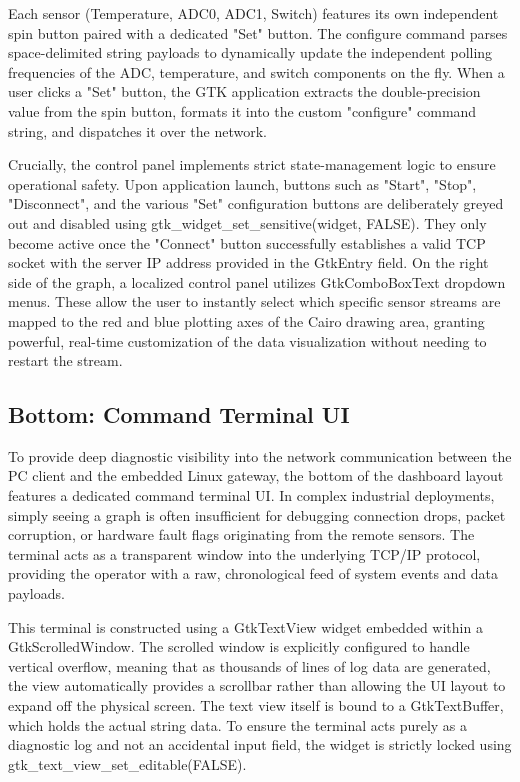 Each sensor (Temperature, ADC0, ADC1, Switch) features its own independent spin button paired with a dedicated "Set" button. The configure command parses space-delimited string payloads to dynamically update the independent polling frequencies of the ADC, temperature, and switch components on the fly. When a user clicks a "Set" button, the GTK application extracts the double-precision value from the spin button, formats it into the custom "configure" command string, and dispatches it over the network.

Crucially, the control panel implements strict state-management logic to ensure operational safety. Upon application launch, buttons such as "Start", "Stop", "Disconnect", and the various "Set" configuration buttons are deliberately greyed out and disabled using gtk\_widget\_set\_sensitive(widget, FALSE). They only become active once the "Connect" button successfully establishes a valid TCP socket with the server IP address provided in the GtkEntry field. On the right side of the graph, a localized control panel utilizes GtkComboBoxText dropdown menus. These allow the user to instantly select which specific sensor streams are mapped to the red and blue plotting axes of the Cairo drawing area, granting powerful, real-time customization of the data visualization without needing to restart the stream.


\subsection{Bottom: Command Terminal UI}
To provide deep diagnostic visibility into the network communication between the PC client and the embedded Linux gateway, the bottom of the dashboard layout features a dedicated command terminal UI. In complex industrial deployments, simply seeing a graph is often insufficient for debugging connection drops, packet corruption, or hardware fault flags originating from the remote sensors. The terminal acts as a transparent window into the underlying TCP/IP protocol, providing the operator with a raw, chronological feed of system events and data payloads.

This terminal is constructed using a GtkTextView widget embedded within a GtkScrolledWindow. The scrolled window is explicitly configured to handle vertical overflow, meaning that as thousands of lines of log data are generated, the view automatically provides a scrollbar rather than allowing the UI layout to expand off the physical screen. The text view itself is bound to a GtkTextBuffer, which holds the actual string data. To ensure the terminal acts purely as a diagnostic log and not an accidental input field, the widget is strictly locked using gtk\_text\_view\_set\_editable(FALSE).

